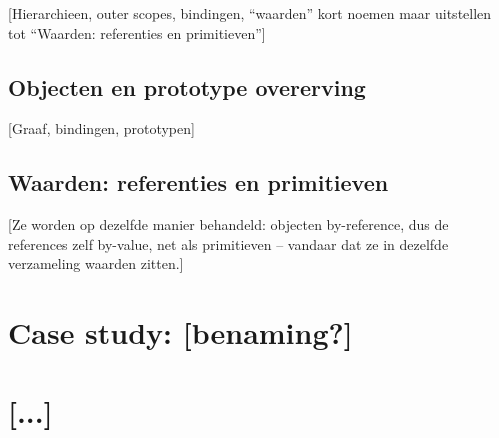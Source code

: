 \documentclass
  [11pt,
   paper=a4,
   cleardouble=plain,
   chapterprefix=true,
   parskip=half,
   draft=true]
  {scrbook}
\newcommand{\<}
  {\ensuremath{\langle}}
\renewcommand{\>}
  {\ensuremath{\rangle}}
\begin{document}
[Hierarchieen, outer scopes, bindingen, ``waarden'' kort noemen maar uitstellen tot ``Waarden: referenties en primitieven'']

\section{Objecten en prototype overerving}

[Graaf, bindingen, prototypen]

\section{Waarden: referenties en primitieven}

[Ze worden op dezelfde manier behandeld: objecten by-reference, dus de references zelf by-value, net als primitieven -- vandaar dat ze in dezelfde verzameling waarden zitten.]

\chapter{Case study: [benaming?]}

\chapter{[...]}

%
%
%

\backmatter
\end{document}
